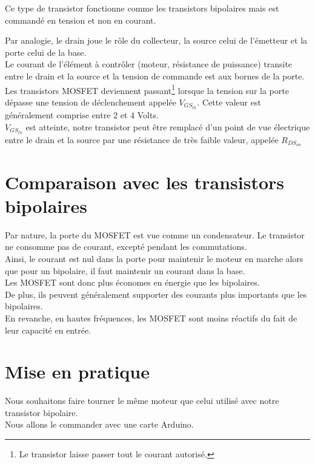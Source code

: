      Ce type de transistor fonctionne comme les transistors bipolaires mais est commandé en tension et non en courant.

     Par analogie, le drain joue le rôle du collecteur, la source celui de l'émetteur et la porte celui de la base.\\
     Le courant de l'élément à contrôler (moteur, résistance de puissance) transite entre le drain et la source et la tension de commande est aux bornes de la porte.\\
     
     Les transistors MOSFET deviennent passant\footnote{Le transistor laisse passer tout le courant autorisé.} lorsque la tension sur la porte dépasse une tension de déclenchement appelée $V_{GS_{th}}$.
     Cette valeur est généralement comprise entre $2$ et $4$ Volts.\\

      $V_{GS_{th}}$ est atteinte, notre transistor peut être remplacé d'un point de vue électrique entre le drain et la source par une résistance de très faible valeur, appelée $R_{DS_{on}}$

    \section{Comparaison avec les transistors bipolaires}

    Par nature, la porte du MOSFET est vue comme un condensateur. Le transistor ne consomme pas de courant, excepté pendant les commutations.\\
    Ainsi, le courant est nul dans la porte pour maintenir le moteur en marche alors que pour un bipolaire, il faut maintenir un courant dans la base.\\

    Les MOSFET sont donc plus économes en énergie que les bipolaires.\\
    De plus, ils peuvent généralement supporter des courants plus importants que les bipolaires.\\

    En revanche, en hautes fréquences, les MOSFET sont moins réactifs du fait de leur capacité en entrée.
     \section{Mise en pratique}

     Nous souhaitons faire tourner le même moteur que celui utilisé avec notre transistor bipolaire.\\
     Nous allons le commander avec une carte Arduino.

